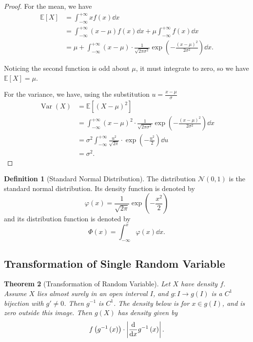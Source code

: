 \documentclass[11pt]{article}
\numberwithin{equation}{section}
\newtheorem{theorem}{Theorem}[section]
\theoremstyle{definition}
\newtheorem{definition}[theorem]{Definition}
\theoremstyle{remark}
\newcommand{\pqty}[1]{\left(#1\right)}
\newcommand{\bqty}[1]{\left[#1\right]}
\newcommand{\abs}[1]{\left|#1\right|}
\newcommand{\plusinfty}{+\infty}
\newcommand{\minusinfty}{-\infty}
\newcommand{\inverse}{^{-1}}
\newcommand{\Expt}{\mathbb E}
\DeclareMathOperator{\Var}{Var}
\newcommand{\sNormPdf}{\varphi}
\newcommand{\sNormCdf}{\Phi}
\newcommand{\Normal}{\mathcal N}
\begin{document}
\begin{proof}\label{probability-proof-065}
    For the mean, we have
    \begin{align*}
        \Expt\bqty{X} &= \int_{\minusinfty}^{\plusinfty} x f\pqty{x} \dd{x} \\
        &= \int_{\minusinfty}^{\plusinfty} \pqty{x - \mu} f\pqty{x} \dd{x} + \mu \int_{\minusinfty}^{\plusinfty} f\pqty{x} \dd{x} \\
        &= \mu + \int_{\minusinfty}^{\plusinfty} \pqty{x - \mu} \cdot \frac{1}{\sqrt{2 \pi \sigma^2}} \exp\pqty{-\frac{\pqty{x - \mu}^2}{2 \sigma^2}} \dd{x}.
    \end{align*}

    Noticing the second function is odd about \(\mu\), it must integrate to zero, so we have \(\Expt\bqty{X} = \mu\).

    For the variance, we have, using the substitution \(u = \frac{x - \mu}{\sigma}\)
    \begin{align*}
        \Var\pqty{X} &= \Expt\bqty{\pqty{X - \mu}^2} \\
        &=  \int_{\minusinfty}^{\plusinfty} \pqty{x - \mu}^2 \cdot \frac{1}{\sqrt{2 \pi \sigma^2}} \exp\pqty{-\frac{\pqty{x - \mu}^2}{2 \sigma^2}} \dd{x} \\
        &= \sigma^2 \int_{\minusinfty}^{\plusinfty} \frac{u^2}{\sqrt{2\pi}} \cdot \exp\pqty{-\frac{u^2}{2}} \dd{u} \\
        &= \sigma^2.
    \end{align*}
\end{proof}

\begin{definition}[Standard Normal Distribution]\label{probability-definition-049}
    \label{probability-def:standard-normal}%
    The distribution \(\Normal\pqty{0, 1}\) is the standard normal distribution. Its density function is denoted by
    \[
        \sNormPdf\pqty{x} = \frac{1}{\sqrt{2\pi}} \exp\pqty{- \frac{x^2}{2}}
    \]
    and its distribution function is denoted by
    \[
        \sNormCdf\pqty{x} = \int_{\minusinfty}^{x} \sNormPdf\pqty{x} \dd{x}.
    \]  
\end{definition}

\subsection{Transformation of Single Random Variable}

\begin{theorem}[Transformation of Random Variable]\label{probability-theorem-018}
    \label{probability-thm:transformation-of-random-variable}
    Let \(X\) have density \(f\). Assume \(X\) lies almost surely in an open interval \(I\), and \(g:I\to g(I)\) is a \(C^1\) bijection with \(g\prime\ne0\). Then \(g^{-1}\) is \(C^1\). The density below is for \(x\in g(I)\), and is zero outside this image. Then \(g\pqty{X}\) has density given by
    \[
        f\pqty{g\inverse\pqty{x}} \cdot \abs{\dv{x} g\inverse\pqty{x}}.
    \]
\end{theorem}
\end{document}
